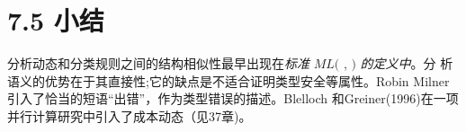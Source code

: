 \section{7.5 小结}

分析动态和分类规则之间的结构相似性最早出现在{\it 标准} $ML ($ , $)$ {\it 的定义中}。分%
析语义的优势在于其直接性;它的缺点是不适合证明类型安全等属性。Robin Milner 引入了恰当的短语“出错”，作为类型错误的描述。Blelloch 和Greiner(1996)在一项并行计算研究中引入了成本动态（见37章)。

